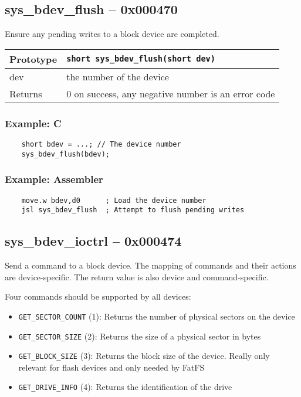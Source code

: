 \subsection*{sys\_bdev\_flush -- 0x000470}
Ensure any pending writes to a block device are completed.

\bigskip

\begin{tabular}{|l||l|} \hline
Prototype & \lstinline!short sys_bdev_flush(short dev)! \\ \hline
dev & the number of the device \\ \hline
Returns & 0 on success, any negative number is an error code \\ \hline
\end{tabular}

\subsubsection*{Example: C}
\begin{lstlisting}
    short bdev = ...; // The device number
    sys_bdev_flush(bdev);
\end{lstlisting}

\subsubsection*{Example: Assembler}
\begin{verbatim}
    move.w bdev,d0      ; Load the device number
    jsl sys_bdev_flush  ; Attempt to flush pending writes
\end{verbatim}

\subsection*{sys\_bdev\_ioctrl -- 0x000474}
Send a command to a block device. The mapping of commands and their actions are device-specific. The return value is also device and command-specific.

Four commands should be supported by all devices:
\begin{itemize}
    \item \verb+GET_SECTOR_COUNT+ (1): Returns the number of physical sectors on the device
    \item \verb+GET_SECTOR_SIZE+ (2): Returns the size of a physical sector in bytes
    \item \verb+GET_BLOCK_SIZE+ (3): Returns the block size of the device. Really only relevant for flash devices and only needed by FatFS
    \item \verb+GET_DRIVE_INFO+ (4): Returns the identification of the drive
\end{itemize}

